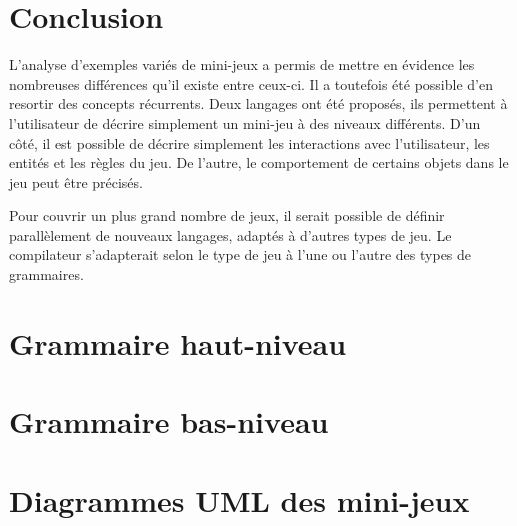 \documentclass[a4paper,10pt]{article}
\begin{document}
\section*{Conclusion}

L'analyse d'exemples variés de mini-jeux a permis de mettre en évidence les nombreuses différences qu'il existe entre ceux-ci.
Il a toutefois été possible d'en resortir des concepts récurrents.
Deux langages ont été proposés, ils permettent à l'utilisateur de décrire simplement un mini-jeu à des niveaux différents.
D'un côté, il est possible de décrire simplement les interactions avec l'utilisateur, les entités et les règles du jeu.
De l'autre, le comportement de certains objets dans le jeu peut être précisés.

Pour couvrir un plus grand nombre de jeux, il serait possible de définir parallèlement de nouveaux langages, adaptés à d'autres types de jeu.
Le compilateur s'adapterait selon le type de jeu à l'une ou l'autre des types de grammaires.


\clearpage
\appendix

\section{Grammaire haut-niveau}
\label{sec:hautniveau}


\section{Grammaire bas-niveau}
\label{sec:basniveau}


\clearpage
\section{Diagrammes UML des mini-jeux}
\label{sec:uml}

\end{document}
